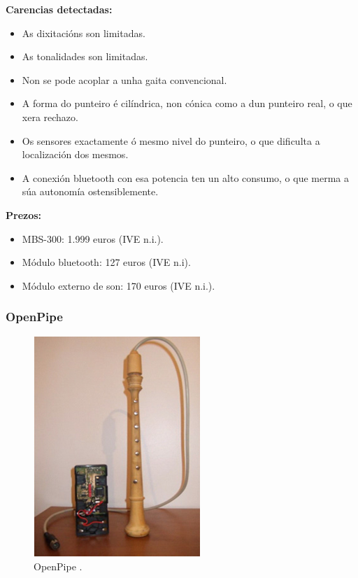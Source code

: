   \textbf{Carencias detectadas:}

  \begin{itemize}
   \item As dixitacións son limitadas.
   \item As tonalidades son limitadas.
   \item Non se pode acoplar a unha gaita convencional.
   \item A forma do punteiro é cilíndrica, non cónica como a dun punteiro real,
         o que xera rechazo.
   \item Os sensores exactamente ó mesmo nivel do punteiro, o que dificulta a
         localización dos mesmos.
   \item A conexión bluetooth con esa potencia ten un alto consumo, o que
         merma a súa autonomía ostensiblemente.
  \end{itemize}

  \textbf{Prezos:}

  \begin{itemize}
   \item MBS-300: 1.999 euros (IVE n.i.).
   \item Módulo bluetooth: 127 euros (IVE n.i).
   \item Módulo externo de son: 170 euros (IVE n.i.).
  \end{itemize}

  \subsubsection{OpenPipe}
 
  \begin{figure}[htbp]
   \centering
   \includegraphics[scale=0.7,keepaspectratio=true]{./imagenes/openpipe.png}
   \caption[OpenPipe]{OpenPipe \cite{OpenPipe}.}
   \label{figura:OpenPipe}
  \end{figure}

